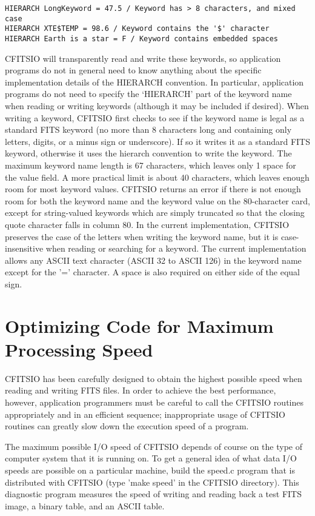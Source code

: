\documentclass[11pt]{book}
\begin{document}
\begin{verbatim}
HIERARCH LongKeyword = 47.5 / Keyword has > 8 characters, and mixed case
HIERARCH XTE$TEMP = 98.6 / Keyword contains the '$' character
HIERARCH Earth is a star = F / Keyword contains embedded spaces
\end{verbatim}
CFITSIO will transparently read and write these keywords, so application
programs do not in general need to know anything about the specific
implementation details of the HIERARCH convention.  In particular,
application programs do not need to specify the `HIERARCH' part of the
keyword name when reading or writing keywords (although it
may be included if desired).  When writing a keyword, CFITSIO first
checks to see if the keyword name is legal as a standard FITS keyword
(no more than 8 characters long and containing only letters, digits, or
a minus sign or underscore). If so it writes it as a standard FITS
keyword, otherwise it uses the hierarch convention to write the
keyword.   The maximum keyword name length is 67 characters, which
leaves only 1 space for the value field.  A more practical limit is
about 40 characters, which leaves enough room for most keyword values.
CFITSIO returns an error if there is not enough room for both the
keyword name and the keyword value on the 80-character card, except for
string-valued keywords which are simply truncated so that the closing
quote character falls in column 80.  In the current implementation,
CFITSIO preserves the case of the letters when writing the keyword
name, but it is case-insensitive when reading or searching for a
keyword.  The current implementation allows any ASCII text character
(ASCII 32 to ASCII 126) in the keyword name except for the '='
character.  A space is also required on either side of the equal sign.


\section{Optimizing Code for Maximum Processing Speed}

CFITSIO has been carefully designed to obtain the highest possible
speed when reading and writing FITS files.  In order to achieve the
best performance, however, application programmers must be careful to
call the CFITSIO routines appropriately and in an efficient sequence;
inappropriate usage of CFITSIO routines can greatly slow down the
execution speed of a program.

The maximum possible I/O speed of CFITSIO depends of course on the type
of computer system that it is running on.  To get a general idea of what
data I/O speeds are possible on a particular machine, build the speed.c
program that is distributed with CFITSIO (type 'make speed' in the CFITSIO
directory).  This diagnostic program measures the speed of writing and reading
back a test FITS image, a binary table, and an ASCII table.
\end{document}
